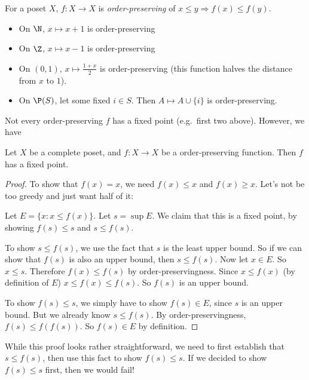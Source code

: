 \documentclass[a4paper]{article}
\begin{document}
\begin{defi}
  For a poset $X$, $f: X\to X$ is \emph{order-preserving} of $x \leq y \Rightarrow f(x) \leq f(y)$.
\end{defi}

\begin{eg}\leavevmode
  \begin{itemize}
    \item On $\N$, $x\mapsto x + 1$ is order-preserving
    \item On $\Z$, $x\mapsto x - 1$ is order-preserving
    \item On $(0, 1)$, $x\mapsto \frac{1 + x}{2}$ is order-preserving (this function halves the distance from $x$ to $1$).
    \item On $\P(S)$, let some fixed $i\in S$. Then $A\mapsto A\cup \{i\}$ is order-preserving.
  \end{itemize}
\end{eg}
Not every order-preserving $f$ has a fixed point (e.g.\ first two above). However, we have
\begin{thm}
  Let $X$ be a complete poset, and $f: X\to X$ be a order-preserving function. Then $f$ has a fixed point.
\end{thm}

\begin{proof}
  To show that $f(x) = x$, we need $f(x) \leq x$ and $f(x) \geq x$. Let's not be too greedy and just want half of it:

  Let $E = \{x: x \leq f(x)\}$. Let $s = \sup E$. We claim that this is a fixed point, by showing $f(s) \leq s$ and $s \leq f(s)$.

  To show $s \leq f(s)$, we use the fact that $s$ is the least upper bound. So if we can show that $f(s)$ is also an upper bound, then $s \leq f(s)$. Now let $x \in E$. So $x\leq s$. Therefore $f(x) \leq f(s)$ by order-preservingness. Since $x \leq f(x)$ (by definition of $E$) $x \leq f(x) \leq f(s)$. So $f(s)$ is an upper bound.

  To show $f(s) \leq s$, we simply have to show $f(s) \in E$, since $s$ is an upper bound. But we already know $s \leq f(s)$. By order-preservingness, $f(s) \leq f(f(s))$. So $f(s)\in E$ by definition.
\end{proof}
While this proof looks rather straightforward, we need to first establish that $s \leq f(s)$, then use this fact to show $f(s) \leq s$. If we decided to show $f(s) \leq s$ first, then we would fail!
\end{document}
